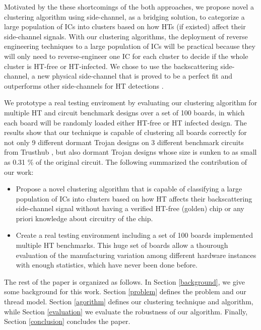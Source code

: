 \documentclass[journal]{IEEEtran}
\begin{document}
Motivated by the these shortcomings of the both approaches, we propose novel a clustering algorithm using side-channel, as a bridging solution, to categorize a large population of ICs into clusters
based on how HTs (if existed) affect their side-channel signals. With our clustering algorithms, the deployment of reverse engineering techniques to a large population of ICs will be practical because they will only need to reverse-engineer one IC for each cluster to decide if the whole cluster is HT-free or HT-infected. We chose to use the backscattering side-channel, a new physical side-channel that is proved to be a perfect fit and outperforms other side-channels for HT detections \cite{8701559}.

We prototype a real testing enviroment by evaluating our clustering algorithm for multiple HT and circuit benchmark designs over a set of 100 boards, in which each board will be randomly loaded either HT-free or HT infected design. The results show that our technique is capable of clustering all boards correctly for not only 9 different dormant Trojan designs on 3 different benchmark circuits from Trusthub \cite{shakya2017benchmarking}, but also dormant Trojan designs whose size is sunken to as small as 0.31 \% of the original circuit. The following summarized the contribution of our work:
\begin{itemize}
	\item Propose a novel clustering algorithm that is capable of classifying a large population of ICs into clusters based on how HT affects their backscattering side-channel signal without having a verified HT-free (golden) chip or any priori knowledge about circuitry of the chip.
	\item Create a real testing environment including a set of 100 boards implemented multiple HT benchmarks. This huge set of boards allow a thourough evaluation of the manufacturing variation among different hardware instances with enough statistics, which have never been done before.  
\end{itemize}

The rest of the paper is organized as follows. In Section \ref{background}, we give some background for this work. Section \ref{problem} defines the problem and our thread model. Section \ref{agorithm} defines our clustering technique and algorithm, while Section \ref{evaluation} we evaluate the robustness of our algorithm. Finally, Section \ref{conclusion} concludes the paper.
\end{document}
